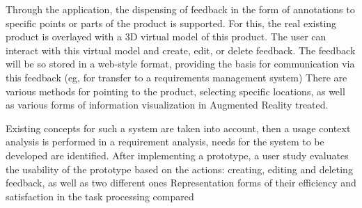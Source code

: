 Through the application, the dispensing of feedback in the form of annotations to specific points or parts of the product is supported. For this, the real existing product is overlayed with a
3D virtual model of this product. The user can interact with this virtual model and create, edit, or delete feedback. The feedback will be so
stored in a web-style format, providing the basis for communication via this feedback (eg, for transfer to a requirements management system)
There are various methods for pointing to the product, selecting specific locations, as well as various forms of information visualization in Augmented Reality
treated.

Existing concepts for such a system are taken into account, then a usage context analysis is performed in a requirement analysis, needs for the system to be developed are identified.
After implementing a prototype, a user study evaluates the usability of the prototype based on the actions: creating, editing and deleting feedback, as well as two different ones
Representation forms of their efficiency and satisfaction in the task processing compared
